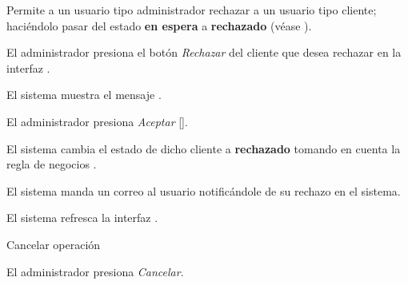 %
%

{
  Permite a un usuario tipo administrador rechazar a un usuario tipo cliente;
  haciéndolo pasar del estado \textbf{en espera} a \textbf{rechazado} (véase
  ).

  \begin{trayectoriaPrincipal}

    \item El administrador presiona el botón \textit{Rechazar} del cliente que
      desea rechazar en la interfaz .

    \item El sistema muestra el mensaje .

    \item El administrador presiona \textit{Aceptar}
      [].

    \item El sistema cambia el estado de dicho cliente a \textbf{rechazado}
      tomando en cuenta la regla de negocios .

    \item El sistema manda un correo al usuario notificándole de su
      rechazo en el sistema.

    \item El sistema refresca la interfaz .

  \end{trayectoriaPrincipal}

  \begin{trayectoriaAlternativa}[ta:cancelar]
    {Cancelar operación}

    \item El administrador presiona \textit{Cancelar}.

  \end{trayectoriaAlternativa}
}
